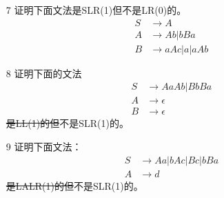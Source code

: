 \documentclass[]{ctexart}
\begin{document}
\begin{enumerate}
	\item[7] 证明下面文法是SLR(1)但不是LR(0)的。
	\begin{align*}
		S &\to A \\
		A &\to Ab | bBa \\
		B &\to aAc | a | aAb
	\end{align*}
	
	
	\item[8] 证明下面的文法
	\begin{align*}
		S &\to AaAb | BbBa \\
		A &\to \epsilon \\
		B &\to \epsilon
	\end{align*}
	\sout{是LL(1)的但}不是SLR(1)的。
	
	\item[9] 证明下面文法：
	\begin{align*}
		S &\to Aa | bAc | Bc | bBa \\
		A &\to d
	\end{align*}
	\sout{是LALR(1)的但}不是SLR(1)的。
\end{enumerate}
\end{document}
